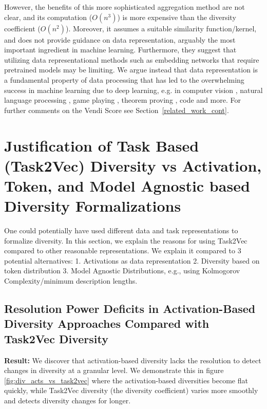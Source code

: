 However, the benefits of this more sophisticated aggregation method are not clear, and its computation ($O(n^3)$) is more expensive than the diversity coefficient ($O(n^2)$). 
Moreover, it assumes a suitable similarity function/kernel, and does not provide guidance on data representation, arguably the most important ingredient in machine learning. 
Furthermore, they suggest that utilizing data representational methods such as embedding networks that require pretrained models may be limiting.
We argue instead that data representation is a fundamental property of data processing that has led to the overwhelming success in machine learning due to deep learning, e.g. in computer vision \citep{alexnet, resnet}, natural language processing \citep{bert, gpt3, chowdhery2022palm, gpt4, google2023palm2}, game playing \citep{alphago, atari1, EfficientZero}, theorem proving \citep{skiptree, gptf, pact}, code \citep{codex} and more.
For further comments on the Vendi Score see Section~\ref{related_work_cont}.

\section{Justification of Task Based (Task2Vec) Diversity vs Activation, Token, and Model Agnostic based Diversity Formalizations}
One could potentially have used different data and task representations to formalize diversity.
In this section, we explain the reasons for using Task2Vec compared to other reasonable representations. 
We explain it compared to 3 potential alternatives: 
1. Activations as data representation
2. Diversity based on token distribution
3. Model Agnostic Distributions, e.g., using Kolmogorov Complexity/minimum description lengths.

\subsection{Resolution Power Deficits in Activation-Based Diversity Approaches Compared with Task2Vec Diversity}\label{subsection:div_acts_vs_task2vec}
\textbf{Result:} 
We discover that activation-based diversity lacks the resolution to detect changes in diversity at a granular level.
We demonstrate this in figure \ref{fig:div_acts_vs_task2vec} where the activation-based diversities become flat quickly, while Task2Vec diversity (the diversity coefficient) varies more smoothly and detects diversity changes for longer. 

